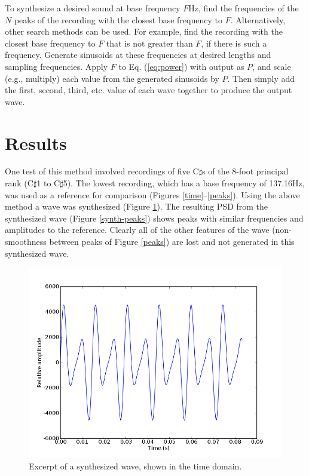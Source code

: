 \documentclass[twocolumn]{article}
\begin{document}
To synthesize a desired sound at base frequency $F$Hz, find the frequencies of the $N$ peaks of the recording with the closest base frequency to $F$. Alternatively, other search methods can be used. For example, find the recording with the closest base frequency to $F$ that is not greater than $F$, if there is such a frequency. Generate sinusoids at these frequencies at desired lengths and sampling frequencies. Apply $F$ to Eq. (\ref{eq:power}) with output as $P$, and scale (e.g., multiply) each value from the generated sinusoids by $P$. Then simply add the first, second, third, etc. value of each wave together to produce the output wave.

\section{Results}

One test of this method involved recordings of five C$\sharp$s of the 8-foot principal rank (C$\sharp$1 to C$\sharp$5). The lowest recording, which has a base frequency of 137.16Hz, was used as a reference for comparison (Figures \ref{time}--\ref{peaks}). Using the above method a wave was synthesized (Figure \ref{synth-time}). The resulting PSD from the synthesized wave (Figure \ref{synth-peaks}) shows peaks with similar frequencies and amplitudes to the reference. Clearly all of the other features of the wave (non-smoothness between peaks of Figure \ref{peaks}) are lost and not generated in this synthesized wave.

\begin{figure}
\centering
\includegraphics[width=\linewidth]{figures/synth-time.png}
\caption{Excerpt of a synthesized wave, shown in the time domain.}
\label{synth-time}
\end{figure}
\end{document}
